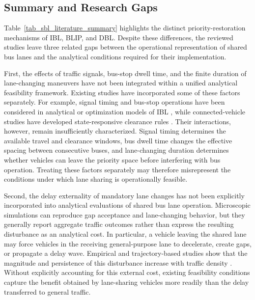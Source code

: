 \subsection{Summary and Research Gaps}

Table~\ref{tab_sbl_literature_summary} highlights the distinct priority-restoration mechanisms of IBL, BLIP, and DBL. Despite these differences, the reviewed studies leave three related gaps between the operational representation of shared bus lanes and the analytical conditions required for their implementation.

First, the effects of traffic signals, bus-stop dwell time, and the finite duration of lane-changing maneuvers have not been integrated within a unified analytical feasibility framework. Existing studies have incorporated some of these factors separately. For example, signal timing and bus-stop operations have been considered in analytical or optimization models of IBL \citep{lin2022capability,xie2023modelling}, while connected-vehicle studies have developed state-responsive clearance rules \citep{xie2021design,jiang2025analysis}. Their interactions, however, remain insufficiently characterized. Signal timing determines the available travel and clearance windows, bus dwell time changes the effective spacing between consecutive buses, and lane-changing duration determines whether vehicles can leave the priority space before interfering with bus operation. Treating these factors separately may therefore misrepresent the conditions under which lane sharing is operationally feasible.

Second, the delay externality of mandatory lane changes has not been explicitly incorporated into analytical evaluations of shared bus lane operation. Microscopic simulations can reproduce gap acceptance and lane-changing behavior, but they generally report aggregate traffic outcomes rather than express the resulting disturbance as an analytical cost. In particular, a vehicle leaving the shared lane may force vehicles in the receiving general-purpose lane to decelerate, create gaps, or propagate a delay wave. Empirical and trajectory-based studies show that the magnitude and persistence of this disturbance increase with traffic density \citep{laval2006lane,tian2016empirical,yang2025impact}. Without explicitly accounting for this external cost, existing feasibility conditions capture the benefit obtained by lane-sharing vehicles more readily than the delay transferred to general traffic.

